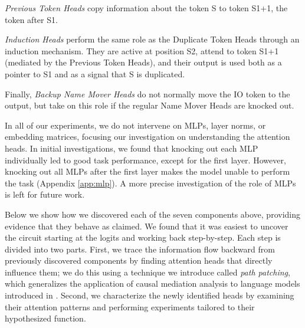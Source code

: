 \begin{compactitem}
    \item \emph{Previous Token Heads} %
    copy information about the token S to token S1+1, the token after S1. %
    \item \emph{Induction Heads} perform the same role as the Duplicate Token Heads through an induction mechanism. They are active at position S2, attend to token S1+1 (mediated by the Previous Token Heads), and 
    their output is used both as a pointer to S1 and as a signal that S is duplicated.
    \item Finally, \emph{Backup Name Mover Heads} do not normally move the IO token to the output, but take on this role if the regular Name Mover Heads are knocked out.
\end{compactitem}

In all of our experiments, we do not intervene on MLPs, %
layer norms,  or embedding matrices, focusing our investigation on understanding the attention heads. 
In initial investigations, we found that knocking out each MLP individually led to good task performance, except for the first layer. However, knocking out all MLPs after the first layer makes the model unable to perform the task (Appendix \ref{app:mlp}). A more precise investigation of the role of MLPs is left for future work.

Below we show how we discovered each of the seven components above, providing evidence that they behave as claimed. We found that it was easiest to uncover the circuit starting at the logits and working back step-by-step. Each step is divided into two parts. First, we trace the information flow backward from previously discovered components by finding attention heads that directly influence them; we do this using a technique we introduce called \emph{path patching}, which generalizes the application of causal mediation analysis to language models introduced in \citet{vig2020investigating}. Second, we characterize the newly identified heads by examining their attention patterns and performing experiments tailored to their hypothesized function. 


